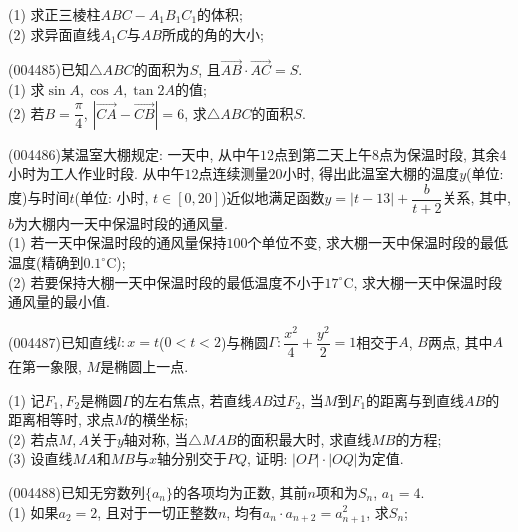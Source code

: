 (1) 求正三棱柱$ABC-A_1B_1C_1$的体积;\\
(2) 求异面直线$A_1C$与$AB$所成的角的大小;
\item (004485)已知$\triangle ABC$的面积为$S$, 且$\overrightarrow{AB}\cdot \overrightarrow{AC}=S$.\\
(1)	求$\sin A,\cos A,\tan 2A$的值;\\
(2)	若$B=\dfrac{\pi }4$, $|\overrightarrow{CA}-\overrightarrow{CB}|=6$, 求$\triangle ABC$的面积$S$.
\item (004486)某温室大棚规定: 一天中, 从中午$12$点到第二天上午$8$点为保温时段, 其余$4$小时为工人作业时段. 从中午$12$点连续测量$20$小时, 得出此温室大棚的温度$y$(单位: 度)与时间$t$(单位: 小时, $t\in [0,20]$)近似地满足函数$y=|t-13|+\dfrac b{t+2}$关系, 其中, $b$为大棚内一天中保温时段的通风量.\\
(1) 若一天中保温时段的通风量保持$100$个单位不变, 求大棚一天中保温时段的最低温度(精确到$0.1^\circ\text{C}$);\\
(2) 若要保持大棚一天中保温时段的最低温度不小于$17^\circ\text{C}$, 求大棚一天中保温时段通风量的最小值.
\item (004487)已知直线$l:x=t$($0<t<2$)与椭圆$\Gamma:\dfrac{x^2}4+\dfrac{y^2}2=1$相交于$A$, $B$两点, 其中$A$在第一象限, $M$是椭圆上一点.
\begin{center}
\end{center}
(1) 记$F_1,F_2$是椭圆$\Gamma$的左右焦点, 若直线$AB$过$F_2$, 当$M$到$F_1$的距离与到直线$AB$的距离相等时, 求点$M$的横坐标;\\
(2) 若点$M,A$关于$y$轴对称, 当$\triangle MAB$的面积最大时, 求直线$MB$的方程;\\
(3) 设直线$MA$和$MB$与$x$轴分别交于$PQ$, 证明: $|OP|\cdot |OQ|$为定值.
\item (004488)已知无穷数列$\{a_n\}$的各项均为正数, 其前$n$项和为$S_n$, $a_1=4$.\\
(1) 如果$a_2=2$, 且对于一切正整数$n$, 均有$a_n\cdot a_{n+2}=a_{n+1}^2$, 求$S_n$;\\
